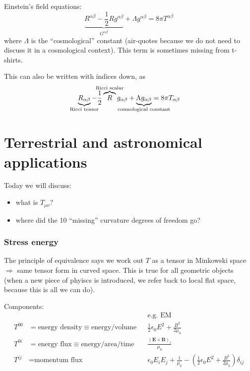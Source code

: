 \documentclass[a4paper]{article} %
\newcommand{\vect}[1]{\mathbf{#1}} %
\begin{document}
Einstein's field equations:
\begin{equation}
\underbrace{R^{\alpha\beta}-\frac{1}{2} R g^{\alpha\beta}}_{G^{\alpha\beta}}+\Lambda g^{\alpha\beta} = 8\pi T^{\alpha\beta}
\end{equation}
where $\Lambda$ is the ``cosmological'' constant (air-quotes because we do not need to discuss it in a cosmological context). This term is sometimes missing from t-shirts.

This can also be written with indices down, as
\begin{equation}
\underbrace{R_{\alpha\beta}}_{\mathclap{\text{Ricci tensor}}}
-\frac{1}{2} \overbrace{R}^{\mathclap{\text{Ricci scalar}}} g_{\alpha\beta}
+\underbrace{\Lambda g_{\alpha\beta}}_{\mathclap{\text{cosmological constant}}} = 8\pi T_{\alpha\beta}
\end{equation}


\pagebreak

\part{Terrestrial and astronomical applications}

Today we will discuss:
\begin{itemize}
\item what is $T_{\mu\nu}$?
\item where did the 10 ``missing'' curvature degrees of freedom go?
\end{itemize}

\section{Stress energy}
The principle of equivalence says we work out $T$ as a tensor in Minkowski space $\Rightarrow$ same tensor form in curved space. This is true for all geometric objects (when a new piece of phyiscs is introduced, we refer back to local flat space, because this is all we can do).

Components:
\begin{align}
&&&\text{e.g. EM}\nonumber \\
T^{00}&=\text{energy density}\equiv\text{energy/volume}&&\frac{1}{2}\epsilon_0 E^2 + \frac{B^2}{2\mu_0}\\
T^{0i}&=\text{energy flux}\equiv\text{energy/area/time}&&\frac{(\vect{E} \times \vect{B})_i}{\mu_0}\\
T^{ij}&=\text{momentum flux}&&\epsilon_0 E_i E_j 
+ \frac{1}{\mu_0}-\left(\frac{1}{2}\epsilon_0 E^2+\frac{B^2}{2\mu_0}\right)\delta_{ij}
\end{align}
\end{document}
